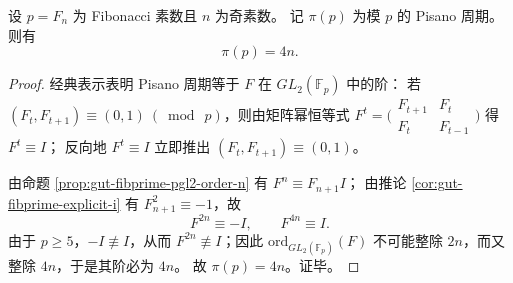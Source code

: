 \begin{corollary}[Pisano 周期的精确封口：\texorpdfstring{$\pi(p)=4n$}{pi(p)=4n}]\label{cor:gut-fibprime-pisano-4n}
设 \(p=F_n\) 为 Fibonacci 素数且 \(n\) 为奇素数。
记 \(\pi(p)\) 为模 \(p\) 的 Pisano 周期。
则有
\[
\pi(p)=4n.
\]
\end{corollary}
\begin{proof}
经典表示表明 Pisano 周期等于 \(F\) 在 \(GL_2(\mathbb{F}_p)\) 中的阶：
若 \((F_t,F_{t+1})\equiv(0,1)\ (\bmod\ p)\)，则由矩阵幂恒等式
\(
F^t=\bigl(\begin{smallmatrix}F_{t+1}&F_t\\F_t&F_{t-1}\end{smallmatrix}\bigr)
\)
得 \(F^t\equiv I\)；
反向地 \(F^t\equiv I\) 立即推出 \((F_t,F_{t+1})\equiv(0,1)\)。
\par
由命题 \ref{prop:gut-fibprime-pgl2-order-n} 有 \(F^n\equiv F_{n+1}I\)；
由推论 \ref{cor:gut-fibprime-explicit-i} 有 \(F_{n+1}^2\equiv -1\)，故
\[
F^{2n}\equiv -I,\qquad F^{4n}\equiv I.
\]
由于 \(p\ge 5\)，\(-I\not\equiv I\)，从而 \(F^{2n}\not\equiv I\)；因此 \(\mathrm{ord}_{GL_2(\mathbb{F}_p)}(F)\) 不可能整除 \(2n\)，而又整除 \(4n\)，于是其阶必为 \(4n\)。
故 \(\pi(p)=4n\)。证毕。
\end{proof}

